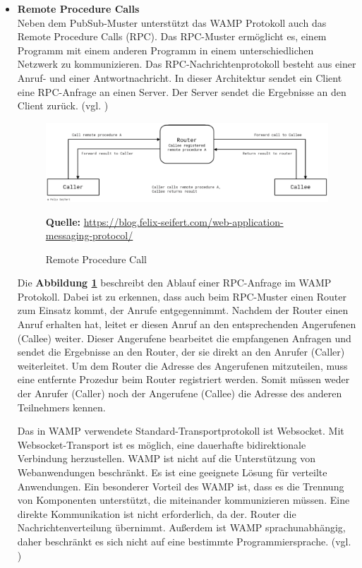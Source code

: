 \begin{itemize}
\item \textbf{Remote Procedure Calls}\\
Neben dem PubSub-Muster unterstützt das WAMP Protokoll auch das Remote Procedure Calls (RPC). Das RPC-Muster ermöglicht es, einem Programm mit einem anderen Programm in einem unterschiedlichen Netzwerk zu kommunizieren. Das RPC-Nachrichtenprotokoll besteht aus einer Anruf- und einer Antwortnachricht. In dieser Architektur sendet ein Client eine RPC-Anfrage an einen Server. Der Server sendet die Ergebnisse an den Client zurück. (vgl. \cite{edu2018})\bigskip

\begin{figure}[H]
  \begin{center}
    \includegraphics[scale=0.4]{img/rpc}
	\caption{Remote Procedure Call}
	\footnotesize\sffamily\textbf{Quelle:} \url{https://blog.felix-seifert.com/web-application-messaging-protocol/} 
	\label{fig:rpc}
  \end{center}   
\end{figure}

Die \textbf{Abbildung \ref{fig:rpc}} beschreibt den Ablauf einer RPC-Anfrage im WAMP Protokoll. Dabei ist zu erkennen, dass auch beim RPC-Muster einen Router zum Einsatz kommt, der Anrufe entgegennimmt. Nachdem der Router einen Anruf erhalten hat, leitet er diesen Anruf an den entsprechenden Angerufenen (Callee) weiter. Dieser Angerufene bearbeitet die empfangenen Anfragen und sendet die Ergebnisse an den Router, der sie direkt an den Anrufer (Caller) weiterleitet. Um dem Router die Adresse des Angerufenen mitzuteilen, muss eine entfernte Prozedur beim Router registriert werden. Somit müssen weder der Anrufer (Caller) noch der Angerufene (Callee) die Adresse des anderen Teilnehmers kennen.\bigskip

Das in WAMP verwendete Standard-Transportprotokoll ist Websocket. Mit Websocket-Transport ist es möglich, eine dauerhafte bidirektionale Verbindung herzustellen. WAMP ist nicht auf die Unterstützung von Webanwendungen beschränkt. Es ist eine geeignete Lösung für verteilte Anwendungen. Ein besonderer Vorteil des WAMP ist, dass es die Trennung von Komponenten unterstützt, die miteinander kommunizieren müssen. Eine direkte Kommunikation ist nicht erforderlich, da der. Router die Nachrichtenverteilung übernimmt. Außerdem ist WAMP sprachunabhängig, daher beschränkt es sich nicht auf eine bestimmte Programmiersprache. (vgl. \cite{edu2018})

\end{itemize}

